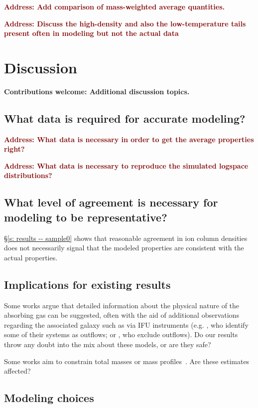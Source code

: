 \documentclass[fleqn,usenatbib]{mnras}
\newcommand{\thoughts}[1]{\textcolor{BurntOrange}{\textbf{Contributions welcome: #1}}}
\newcommand{\todo}[1]{\textcolor{Maroon}{\textbf{Address: #1}}}
\begin{document}
\todo{Add comparison of mass-weighted average quantities.}

\todo{Discuss the high-density and also the low-temperature tails present often in modeling but not the actual data}

\section{Discussion}
\label{s: discussion}

\thoughts{Additional discussion topics.}

\subsection{What data is required for accurate modeling?}

\todo{What data is necessary in order to get the average properties right?}

\todo{What data is necessary to reproduce the simulated logspace distributions?}

\subsection{What level of agreement is necessary for modeling to be representative?}

\S\ref{s: results -- sample0} shows that reasonable agreement in ion column densities does not necessarily signal that the modeled properties are consistent with the actual properties.

\subsection{Implications for existing results}

Some works argue that detailed information about the physical nature of the absorbing gas can be suggested, often with the aid of additional observations regarding the associated galaxy such as via IFU instruments (e.g. \citealt{Peroux2013}, who identify some of their systems as outflows; or \citealt{Peroux2017}, who exclude outflows).
Do our results throw any doubt into the mix about these models, or are they safe?

Some works aim to constrain total masses or mass profiles~\citep[e.g.][]{Zahedy2019a}.
Are these estimates affected?

\subsection{Modeling choices}
\end{document}
